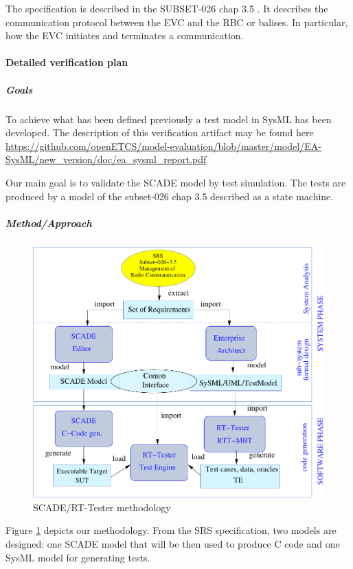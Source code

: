 The specification is described in the
SUBSET-026\cite{unisig_subset-026_2012} chap 3.5 \cite{chap3-5}. It
describes the communication protocol between the EVC and the RBC or
balises. In particular, how the EVC initiates and terminates a
communication.



\paragraph{Detailed verification plan}

\subparagraph{Goals}

To achieve what has been defined previously a test model in SysML has
been developed. The description of this verification artifact may be
found here \url{https://github.com/openETCS/model-evaluation/blob/master/model/EA-SysML/new_version/doc/ea_sysml_report.pdf}

Our main goal is to validate the SCADE model by test simulation. The
tests are produced by a model of the subset-026 chap 3.5 described as a
state machine.

\subparagraph{Method/Approach}

\begin{figure}
\includegraphics[width=\textwidth]{schema/framework}
\caption{\label{fig:method}SCADE/RT-Tester methodology}
\end{figure}

Figure \ref{fig:method} depicts our methodology. From the SRS
specification, two models are designed: one SCADE model that will
be then  used to produce C code and one SysML model for generating
tests.

